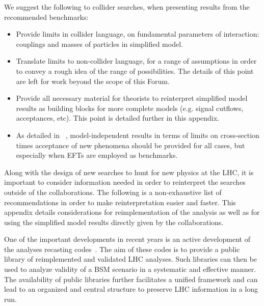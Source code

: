  We suggest the following to collider searches, when presenting results 
 from the recommended benchmarks: 
 \begin{itemize}
 \item Provide limits in collider language, on fundamental parameters of
 interaction: couplings and masses of particles in simplified model.
 \item Translate limits to non-collider language, for a range of
 assumptions in order to convey a rough idea of the range of
 possibilities. The details of this point are left for work beyond the scope of this Forum. 
 \item Provide all necessary material for theorists to reinterpret simplified
 model results as building blocks for more complete models (e.g. signal cutflows,
 acceptances, etc). This point is detailed further in this appendix.
 \item As detailed in ~\cite{Kraml:2012sg}, model-independent results in terms of limits on 
 cross-section times acceptance of new phenomena should be provided for all cases,
 but especially when EFTs are employed as benchmarks. 
 \end{itemize}

Along with the design of new searches to hunt for new physics at the LHC, it is important to consider information needed in order to reinterpret the searches outside of the collaborations. The following is a non-exhaustive list of recommendations in order to make reinterpretation easier and faster. This appendix details considerations for reimplementation of the analysis as well as for using the simplified model results directly given by the collaborations. 

One of the important developments in recent years is an active development of the analyses recasting codes~\cite{Dumont:2014tja, Conte:2014zja, Kim:2015wza,Cranmer:2010hk,ATOM}. The aim of these codes is to provide a public library of reimplemented and validated LHC analyses. Such libraries can then be used to analyze validity of a BSM scenario in a systematic and effective manner. The availability of public libraries further facilitates a unified framework and can lead to an organized and central structure to preserve LHC information in a long run. 


